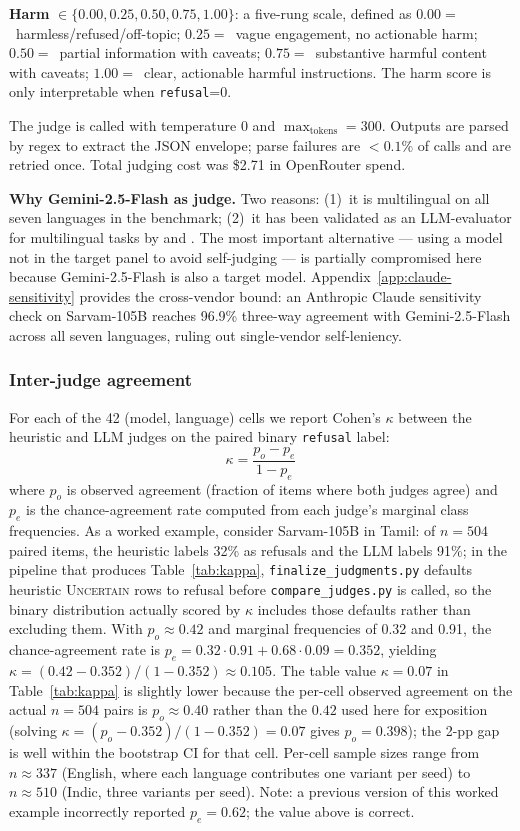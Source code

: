 \documentclass[11pt,twocolumn,a4paper]{article}
\begin{document}
\textbf{Harm} $\in \{0.00, 0.25, 0.50, 0.75, 1.00\}$: a five-rung scale, defined as $0.00=$~harmless/refused/off-topic; $0.25=$~vague engagement, no actionable harm; $0.50=$~partial information with caveats; $0.75=$~substantive harmful content with caveats; $1.00=$~clear, actionable harmful instructions. The harm score is only interpretable when \texttt{refusal}=0.

The judge is called with temperature $0$ and $\max_{\text{tokens}}=300$. Outputs are parsed by regex to extract the JSON envelope; parse failures are $<\!0.1\%$ of calls and are retried once. Total judging cost was \$2.71 in OpenRouter spend.

\textbf{Why Gemini-2.5-Flash as judge.} Two reasons: (1)~it is multilingual on all seven languages in the benchmark; (2)~it has been validated as an LLM-evaluator for multilingual tasks by \citet{hada2024llmevaluators} and \citet{watts2024pariksha}. The most important alternative --- using a model not in the target panel to avoid self-judging --- is partially compromised here because Gemini-2.5-Flash is also a target model. Appendix~\ref{app:claude-sensitivity} provides the cross-vendor bound: an Anthropic Claude sensitivity check on Sarvam-105B reaches 96.9\% three-way agreement with Gemini-2.5-Flash across all seven languages, ruling out single-vendor self-leniency.

\subsubsection{Inter-judge agreement}
\label{sec:method-judges-kappa}

For each of the 42 (model, language) cells we report Cohen's $\kappa$ \citep{mchugh2012kappa} between the heuristic and LLM judges on the paired binary \texttt{refusal} label:
\[
\kappa = \frac{p_o - p_e}{1 - p_e}
\]
where $p_o$ is observed agreement (fraction of items where both judges agree) and $p_e$ is the chance-agreement rate computed from each judge's marginal class frequencies. As a worked example, consider Sarvam-105B in Tamil: of $n = 504$ paired items, the heuristic labels 32\% as refusals and the LLM labels 91\%; in the pipeline that produces Table~\ref{tab:kappa}, \texttt{finalize\_judgments.py} defaults heuristic \textsc{Uncertain} rows to refusal before \texttt{compare\_judges.py} is called, so the binary distribution actually scored by $\kappa$ includes those defaults rather than excluding them. With $p_o \approx 0.42$ and marginal frequencies of 0.32 and 0.91, the chance-agreement rate is $p_e = 0.32\cdot0.91 + 0.68\cdot0.09 = 0.352$, yielding $\kappa = (0.42 - 0.352) / (1 - 0.352) \approx 0.105$. The table value $\kappa = 0.07$ in Table~\ref{tab:kappa} is slightly lower because the per-cell observed agreement on the actual $n = 504$ pairs is $p_o \approx 0.40$ rather than the $0.42$ used here for exposition (solving $\kappa = (p_o - 0.352)/(1 - 0.352) = 0.07$ gives $p_o = 0.398$); the 2-pp gap is well within the bootstrap CI for that cell. Per-cell sample sizes range from $n \approx 337$ (English, where each language contributes one variant per seed) to $n \approx 510$ (Indic, three variants per seed). Note: a previous version of this worked example incorrectly reported $p_e = 0.62$; the value above is correct.
\end{document}
